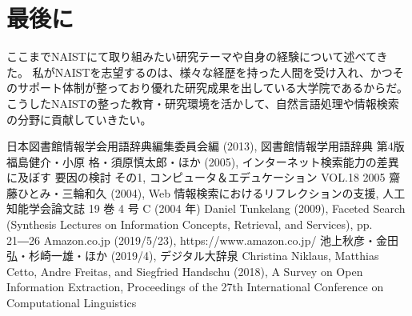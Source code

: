 \documentclass[a4j,10pt, twocolumn]{jarticle} \usepackage[dvipdfmx]{graphicx} \usepackage{amssymb} \usepackage{amsmath}
\begin{document}
\section{最後に}
ここまでNAISTにて取り組みたい研究テーマや自身の経験について述べてきた。
私がNAISTを志望するのは、様々な経歴を持った人間を受け入れ、かつそのサポート体制が整っており優れた研究成果を出している大学院であるからだ。
こうしたNAISTの整った教育・研究環境を活かして、自然言語処理や情報検索の分野に貢献していきたい。

\begin{thebibliography}{9}
  日本図書館情報学会用語辞典編集委員会編 (2013), 図書館情報学用語辞典 第4版
   福島健介・小原 格・須原慎太郎・ほか (2005), インターネット検索能力の差異に及ぼす 要因の検討 その1, コンピュータ＆エデュケーション VOL.18 2005
   齋藤ひとみ・三輪和久 (2004),  Web 情報検索におけるリフレクションの支援, 人工知能学会論文誌 19 巻 4 号 C (2004 年)
  Daniel Tunkelang (2009), Faceted Search (Synthesis Lectures on Information Concepts, Retrieval, and Services), pp. 21―26
  Amazon.co.jp (2019/5/23), https://www.amazon.co.jp/
  池上秋彦・金田弘・杉崎一雄・ほか (2019/4), デジタル大辞泉
  Christina Niklaus, Matthias Cetto, Andre Freitas, and Siegfried Handschu (2018), A Survey on Open Information Extraction, Proceedings of the 27th International Conference on Computational Linguistics
\end{thebibliography}
\end{document}
